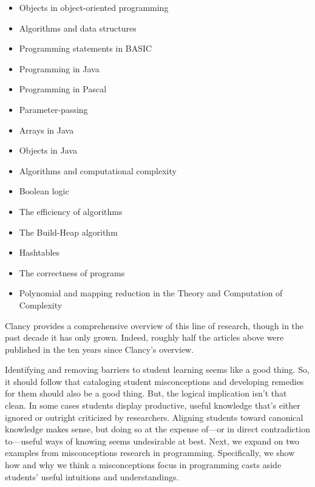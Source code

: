 \begin{itemize}
\tightlist
\item
  Objects in object-oriented programming \cite{holland_avoiding_1997}
\item
  Algorithms and data structures \cite{danielsiek_detecting_2012,paul_hunting_2013}
\item
  Programming statements in BASIC \cite{bayman_diagnosis_1983}
\item
  Programming in Java \cite{fleury_programming_2000}
\item
  Programming in Pascal \cite{fleury_student_1993}
\item
  Parameter-passing \cite{fleury_parameter_1991}
\item
  Arrays in Java \cite{kaczmarczyk_identifying_2010}
\item
  Objects in Java \cite{kaczmarczyk_identifying_2010}
\item
  Algorithms and computational complexity \cite{trakhtenbrot_students_2013}
\item
  Boolean logic \cite{herman_proof_2008}
\item
  The efficiency of algorithms \cite{gal-ezer_efficiency_2004}
\item
  The Build-Heap algorithm \cite{seppala_observations_2006}
\item
  Hashtables \cite{patitsas_countably_2013}
\item
  The correctness of programs \cite{kolikant_my_2008}
\item
  Polynomial and mapping reduction in the Theory and Computation of Complexity \cite{gal-ezer_identification_2016}
\end{itemize}

Clancy \cite{clancy_misconceptions_2004} provides a comprehensive overview of this line of
research, though in the past decade it has only grown. Indeed, roughly
half the articles above were published in the ten years since Clancy's
overview.

Identifying and removing barriers to student learning seems like a good
thing. So, it should follow that cataloging student misconceptions and
developing remedies for them should also be a good thing. But, the
logical implication isn't that clean. In some cases students display
productive, useful knowledge that's either ignored or outright
criticized by researchers. Aligning students toward canonical knowledge
makes sense, but doing so at the expense of---or in direct contradiction
to---useful ways of knowing seems undesirable at best. Next, we expand on
two examples from misconceptions research in programming. Specifically,
we show how and why we think a misconceptions focus in programming casts
aside students' useful intuitions and understandings.


